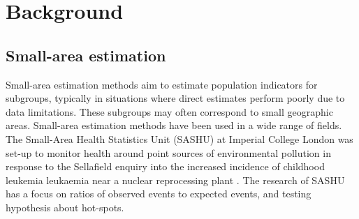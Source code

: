 \documentclass[a4paper, nobind]{templates/ociamthesis}
\begin{document}
\begin{romanpages}
  \dominitoc %

\flushbottom

\tableofcontents

\listoffigures
	\mtcaddchapter

\listoftables
  \mtcaddchapter




\end{romanpages}

\flushbottom

\hypertarget{background}{%
\chapter{Background}\label{background}}

\adjustmtc
{}

\hypertarget{small-area-estimation}{%
\section{Small-area estimation}\label{small-area-estimation}}

Small-area estimation methods aim to estimate population indicators for subgroups, typically in situations where direct estimates perform poorly due to data limitations.
These subgroups may often correspond to small geographic areas.
Small-area estimation methods have been used in a wide range of fields.
The Small-Area Health Statistics Unit (SASHU) at Imperial College London was set-up to monitor health around point sources of environmental pollution in response to the Sellafield enquiry into the increased incidence of childhood leukemia leukaemia near a nuclear reprocessing plant \autocite{elliott1992small}.
The research of SASHU has a focus on ratios of observed events to expected events, and testing hypothesis about hot-spots.
\end{document}
